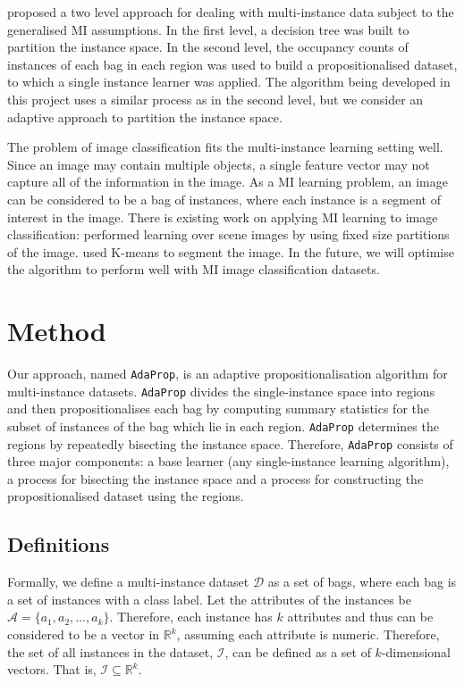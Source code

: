 \documentclass[a4paper,12pt]{article} %
\newcommand{\AdaProp}{\texttt{AdaProp}\xspace}
\newcommand{\real}{\mathbb{R}}
\newcommand{\mcl}[1]{\mathcal{#1}}
\begin{document}
 proposed a two level approach for dealing with multi-instance data 
    subject to the generalised MI assumptions. 
In the first level, 
    a decision tree was built to partition the instance space. 
In the second level, 
    the occupancy counts of instances of each bag in each region 
    was used to build a propositionalised dataset, 
    to which a single instance learner was applied.
The algorithm being developed in this project uses a similar process 
    as  in the second level, 
    but we consider an adaptive approach to partition the instance space.

The problem of image classification fits the multi-instance learning setting well. 
Since an image may contain multiple objects, 
    a single feature vector may not capture all 
    of the information in the image. 
As a MI learning problem, 
    an image can be considered to be a bag of instances, 
    where each instance is a segment of interest in the image. 
There is existing work on applying MI learning to image classification: 
     performed learning over scene images by 
        using fixed size partitions of the image. 
     used K-means to segment the image. 
In the future, 
    we will optimise the algorithm to perform well 
    with MI image classification datasets.

\section{Method}

Our approach, named \AdaProp, is an adaptive propositionalisation algorithm 
    for multi-instance datasets.
\AdaProp divides the single-instance space
    into regions and then propositionalises each bag 
    by computing summary statistics for the 
    subset of instances of the bag which lie in each region.
\AdaProp determines the regions by repeatedly bisecting the instance space.
Therefore, \AdaProp consists of three major components: 
    a base learner (any single-instance learning algorithm),
    a process for bisecting the instance space and 
    a process for constructing the propositionalised dataset using the regions.

\subsection{Definitions}
Formally, we define a multi-instance dataset $\mcl{D}$ as a set of bags, 
    where each bag is a set of instances with a class label.
Let the attributes of the instances be  
    $\mcl{A} = \{ a_1,a_2,\ldots,a_k \}$.
Therefore, each instance has $k$ attributes and
    thus can be considered to be a vector in $\real^k$,
    assuming each attribute is numeric.
Therefore, the set of all instances in the dataset, $\mcl{I}$,
    can be defined as a set of $k$-dimensional vectors.
That is, $ \mcl{I} \subseteq \real^k $.
\end{document}
